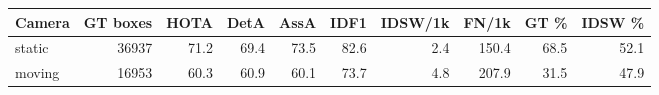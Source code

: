 \begin{tabular}{lrrrrrrrrr}
\toprule
Camera & GT boxes & HOTA & DetA & AssA & IDF1 & IDSW/1k & FN/1k & GT \% & IDSW \% \\
\midrule
static & 36937 & 71.2 & 69.4 & 73.5 & 82.6 & 2.4 & 150.4 & 68.5 & 52.1 \\
moving & 16953 & 60.3 & 60.9 & 60.1 & 73.7 & 4.8 & 207.9 & 31.5 & 47.9 \\
\bottomrule
\end{tabular}
